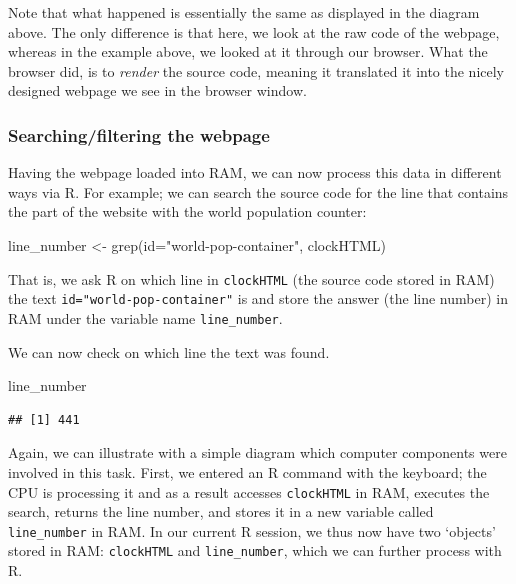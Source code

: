 \documentclass[
  12pt,
]{style/krantz}
\newenvironment{Shaded}{\begin{snugshade}}{\end{snugshade}}
\newcommand{\FunctionTok}[1]{\textcolor[rgb]{0.00,0.00,0.00}{#1}}
\newcommand{\NormalTok}[1]{#1}
\newcommand{\OtherTok}[1]{\textcolor[rgb]{0.56,0.35,0.01}{#1}}
\newcommand{\StringTok}[1]{\textcolor[rgb]{0.31,0.60,0.02}{#1}}
\begin{document}
Note that what happened is essentially the same as displayed in the diagram above. The only difference is that here, we look at the raw code of the webpage, whereas in the example above, we looked at it through our browser. What the browser did, is to \emph{render} the source code, meaning it translated it into the nicely designed webpage we see in the browser window.

\hypertarget{searchingfiltering-the-webpage}{%
\subsubsection{Searching/filtering the webpage}\label{searchingfiltering-the-webpage}}

Having the webpage loaded into RAM, we can now process this data in different ways via R. For example; we can search the source code for the line that contains the part of the website with the world population counter:

\begin{Shaded}
\begin{Highlighting}[]
\NormalTok{line\_number }\OtherTok{\textless{}{-}} \FunctionTok{grep}\NormalTok{(}\StringTok{\textquotesingle{}id="world{-}pop{-}container"\textquotesingle{}}\NormalTok{, clockHTML)}
\end{Highlighting}
\end{Shaded}

That is, we ask R on which line in \texttt{clockHTML} (the source code stored in RAM) the text \texttt{id="world-pop-container"} is and store the answer (the line number) in RAM under the variable name \texttt{line\_number}.

We can now check on which line the text was found.

\begin{Shaded}
\begin{Highlighting}[]
\NormalTok{line\_number}
\end{Highlighting}
\end{Shaded}

\begin{verbatim}
## [1] 441
\end{verbatim}

Again, we can illustrate with a simple diagram which computer components were involved in this task. First, we entered an R command with the keyboard; the CPU is processing it and as a result accesses \texttt{clockHTML} in RAM, executes the search, returns the line number, and stores it in a new variable called \texttt{line\_number} in RAM. In our current R session, we thus now have two `objects' stored in RAM: \texttt{clockHTML} and \texttt{line\_number}, which we can further process with R.
\end{document}
